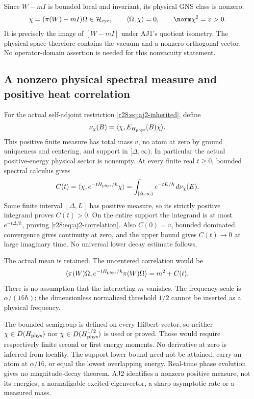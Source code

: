 Since $W-mI$ is bounded local and invariant, its physical GNS class is nonzero:
\begin{equation}
 \chi=(\pi(W)-mI)\Omega\in\mathcal H_{\rm cyc},\qquad
 \langle\Omega,\chi\rangle=0,\qquad\norm\chi^2=v>0.
 \label{r28:eq:aj2-vector}
\end{equation}
It is precisely the image of $[W-mI]$ under AJ1's quotient isometry. The physical space therefore contains the vacuum and a nonzero orthogonal vector. No operator-domain assertion is needed for this nonvacuity statement.

\subsection{A nonzero physical spectral measure and positive heat correlation}
For the actual self-adjoint restriction \eqref{r28:eq:aj2-inherited}, define
\begin{equation}
 \nu_\chi(B)=\langle\chi,E_{H_{\rm phys}}(B)\chi\rangle.
\end{equation}
This positive finite measure has total mass $v$, no atom at zero by ground uniqueness and centering, and support in $[\Delta,\infty)$. In particular the actual positive-energy physical sector is nonempty. At every finite real $t\ge0$, bounded spectral calculus gives
\begin{equation}
 C(t)=\langle\chi,e^{-tH_{\rm phys}/\hbar}\chi\rangle
     =\int_{[\Delta,\infty)}e^{-tE/\hbar}\,d\nu_\chi(E).
 \label{r28:eq:aj2-spectral}
\end{equation}
Some finite interval $[\Delta,L]$ has positive measure, so its strictly positive integrand proves $C(t)>0$. On the entire support the integrand is at most $e^{-t\Delta/\hbar}$, proving \eqref{r28:eq:aj2-correlation}. Also $C(0)=v$, bounded dominated convergence gives continuity at zero, and the upper bound gives $C(t)\to0$ at large imaginary time. No universal lower decay estimate follows.

The actual mean is retained. The uncentered correlation would be
\begin{equation}
 \langle\pi(W)\Omega,e^{-tH_{\rm phys}/\hbar}\pi(W)\Omega\rangle
 =m^2+C(t).
\end{equation}
There is no assumption that the interacting $m$ vanishes. The frequency scale is $\alpha/(16\hbar)$; the dimensionless normalized threshold $1/2$ cannot be inserted as a physical frequency.

The bounded semigroup is defined on every Hilbert vector, so neither $\chi\in D(H_{\rm phys})$ nor $\chi\in D(H_{\rm phys}^{1/2})$ is used or proved. Those would require respectively finite second or first energy moments. No derivative at zero is inferred from locality. The support lower bound need not be attained, carry an atom at $\alpha/16$, or equal the lowest overlapping energy. Real-time phase evolution gives no magnitude-decay theorem. AJ2 identifies a nonzero positive measure, not its energies, a normalizable excited eigenvector, a sharp asymptotic rate or a measured mass.


